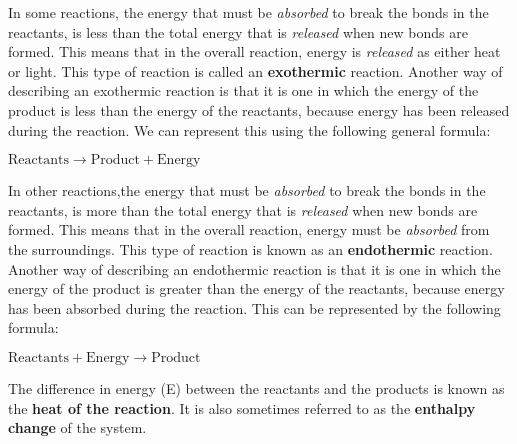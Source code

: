 In some reactions, the energy that must be \textit{absorbed} to break the bonds in the reactants, is less than
the total energy that is \textit{released} when new bonds are formed. This means that in the overall reaction, energy is \textit{released} as either heat or light. This type of reaction is called an \textbf{exothermic} reaction. Another way of describing an exothermic reaction is that it is one in which the energy of the product is less than the energy of the reactants, because energy has been released during the reaction. We can represent this using the following general formula:

\begin{center}
  $\text{Reactants} \rightarrow \text{Product} + \text{Energy}$
\end{center}

In other reactions,the energy that must be \textit{absorbed} to break the bonds in the reactants, is more than
the total energy that is \textit{released} when new bonds are formed. This means that in the overall reaction, energy must be \textit{absorbed} from the surroundings. This type of reaction is known as an \textbf{endothermic} reaction. Another way of describing an endothermic reaction is that it is one in which the energy of the product is greater than the energy of the reactants, because energy has been absorbed during the reaction. This can be represented by the following formula:

\begin{center}
  $\text{Reactants} + \text{Energy} \rightarrow \text{Product}$
\end{center}

The difference in energy (E) between the reactants and the products is known as the \textbf{heat of the reaction}. It is also sometimes referred to as the \textbf{enthalpy change} of the system.

